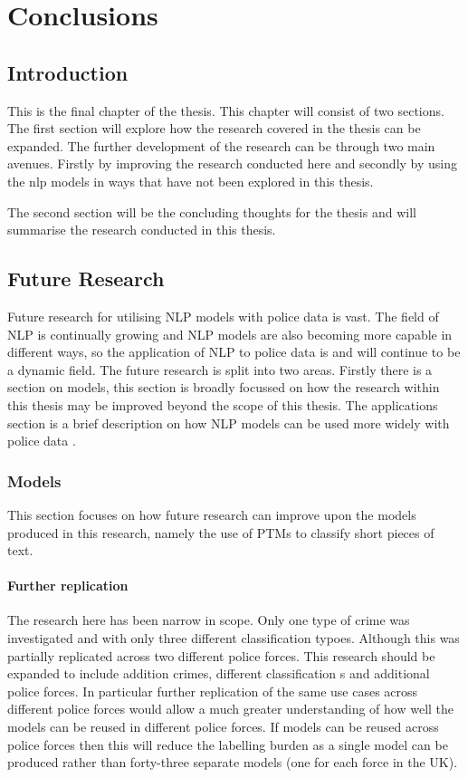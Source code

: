 \chapter{Conclusions}

\section{Introduction} This is the final chapter of the thesis. This chapter will consist of two sections. The first section will explore how the research covered in the thesis can be expanded. The  further development of the research can be through two main avenues. Firstly by improving the research conducted here and secondly by using the nlp models in ways that have not been explored in this thesis. 

The second section will be the concluding thoughts for the thesis and will summarise the research conducted in this thesis. 

\section{Future Research} Future research for utilising NLP models with police data is vast. The field of NLP is continually growing and NLP models are also becoming more capable in different ways, so the application of NLP to police data is and will continue to be a dynamic field. The future research is split into two areas. Firstly there is a section on models, this section is broadly focussed on how the research within this thesis may be improved beyond the scope of this thesis.  The applications section is a brief description on how NLP models can be used more widely with police data . 

\subsection{Models}  This section focuses on how future research can improve upon the models produced in this research, namely the use of PTMs to classify short pieces of text.

\subsubsection{Further replication} The research here has been narrow in scope. Only one type of crime was investigated and with only three different classification typoes. Although this was partially replicated across two different police forces.  This research should be expanded to include addition crimes, different classification s and additional police forces. In particular further replication of the same use cases across different police forces would allow a much greater understanding of how well the models can be reused in different police forces. If models can be reused across police forces then this will reduce the labelling burden as a single model can be produced rather than forty-three separate models (one for each force in the UK). 

